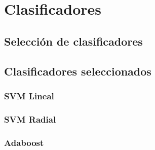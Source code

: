 
\chapter{Clasificadores}
\label{cap:clasificadores}

\section{Selección de clasificadores}
\label{clasificadores:seleccion}

\section{Clasificadores seleccionados}
\label{clasificadores:clasificadores}

\subsection{SVM Lineal}
\label{propuestas:svmlineal}

\subsection{SVM Radial}
\label{propuestas:svmradial}

\subsection{Adaboost}
\label{propuestas:adaboost}

